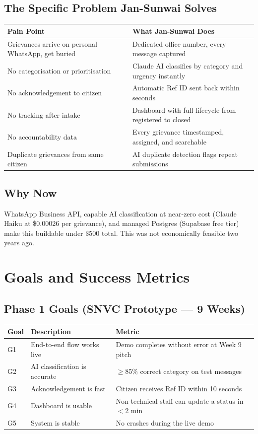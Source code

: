 \documentclass[11pt, a4paper]{article}
\begin{document}
\subsection{The Specific Problem Jan-Sunwai Solves}

\begin{tabularx}{\linewidth}{lX}
\toprule
\textbf{Pain Point} & \textbf{What Jan-Sunwai Does} \\
\midrule
Grievances arrive on personal WhatsApp, get buried & Dedicated office number, every message captured \\
No categorisation or prioritisation & Claude AI classifies by category and urgency instantly \\
No acknowledgement to citizen & Automatic Ref ID sent back within seconds \\
No tracking after intake & Dashboard with full lifecycle from registered to closed \\
No accountability data & Every grievance timestamped, assigned, and searchable \\
Duplicate grievances from same citizen & AI duplicate detection flags repeat submissions \\
\bottomrule
\end{tabularx}

\subsection{Why Now}

WhatsApp Business API, capable AI classification at near-zero cost (Claude Haiku at \$0.00026 per grievance), and managed Postgres (Supabase free tier) make this buildable under \$500 total. This was not economically feasible two years ago.

\newpage

\section{Goals and Success Metrics}

\subsection{Phase 1 Goals (SNVC Prototype --- 9 Weeks)}

\begin{tabularx}{\linewidth}{lXl}
\toprule
\textbf{Goal} & \textbf{Description} & \textbf{Metric} \\
\midrule
G1 & End-to-end flow works live & Demo completes without error at Week 9 pitch \\
G2 & AI classification is accurate & $\geq$85\% correct category on test messages \\
G3 & Acknowledgement is fast & Citizen receives Ref ID within 10 seconds \\
G4 & Dashboard is usable & Non-technical staff can update a status in $<$2 min \\
G5 & System is stable & No crashes during the live demo \\
\bottomrule
\end{tabularx}
\end{document}
